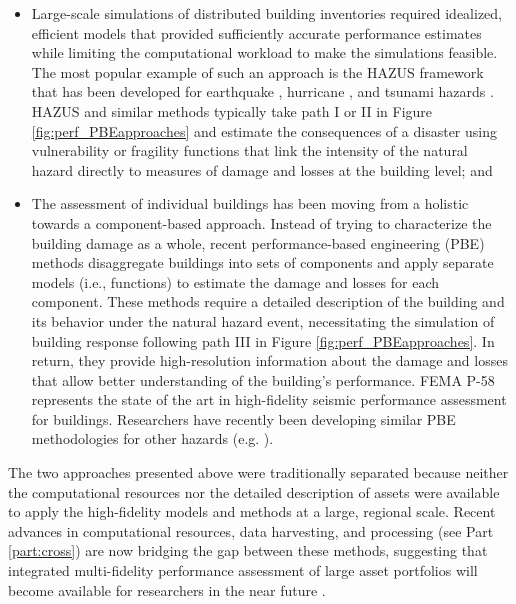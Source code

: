 \begin{itemize}
    \item Large-scale simulations of distributed building inventories required idealized, efficient models that provided sufficiently accurate performance estimates while limiting the computational workload to make the simulations feasible. The most popular example of such an approach is the HAZUS framework that has been developed for earthquake \citep{fema2018earthquaketechnical}, hurricane \citep{fema2018hurricaneuser}, and tsunami hazards \citep{fema2017tsunamitechnical}. HAZUS and similar methods typically take path I or II in Figure \ref{fig:perf_PBEapproaches} and estimate the consequences of a disaster using vulnerability or fragility functions that link the intensity of the natural hazard directly to measures of damage and losses at the building level; and

    \item The assessment of individual buildings has been moving from a holistic towards a component-based approach. Instead of trying to characterize the building damage as a whole, recent performance-based engineering (PBE) methods disaggregate buildings into sets of components and apply separate models (i.e., functions) to estimate the damage and losses for each component. These methods require a detailed description of the building and its behavior under the natural hazard event, necessitating the simulation of building response following path III in Figure \ref{fig:perf_PBEapproaches}. In return, they provide high-resolution information about the damage and losses that allow better understanding of the building's performance. FEMA P-58 \citep{atc2018p-58-1} represents the state of the art in high-fidelity seismic performance assessment for buildings. Researchers have recently been developing similar PBE methodologies for other hazards (e.g. \cite{barbato2013performancebased, ouyang2020performance, attary2017performancebased}).
\end{itemize}

The two approaches presented above were traditionally separated because neither the computational resources nor the detailed description of assets were available to apply the high-fidelity models and methods at a large, regional scale. Recent advances in computational resources, data harvesting, and processing (see Part \ref{part:cross}) are now bridging the gap between these methods, suggesting that integrated multi-fidelity performance assessment of large asset portfolios will become available for researchers in the near future \citep{deierlein2020cloud}.


